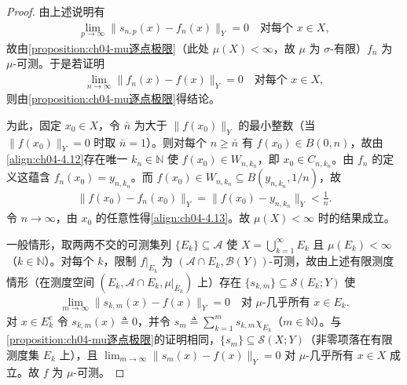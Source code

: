 \documentclass[../../main.tex]{subfiles}%
\begin{document}
\begin{proof}
由上述说明有
\begin{align*}
\lim_{p\to\infty}\|s_{n,p}(x)-f_n(x)\|_Y=0\quad\text{对每个 }x\in X,
\end{align*}
故由\cref{proposition:ch04-mu逐点极限}（此处 $\mu(X)<\infty$，故 $\mu$ 为 $\sigma$-有限）$f_n$ 为 $\mu$-可测。于是若证明
\begin{align}
\lim_{n\to\infty}\|f_n(x)-f(x)\|_Y=0\quad\text{对每个 }x\in X, \label{align:ch04-4.13}
\end{align}
则由\cref{proposition:ch04-mu逐点极限}得结论。

为此，固定 $x_0\in X$，令 $\bar n$ 为大于 $\|f(x_0)\|_Y$ 的最小整数（当 $\|f(x_0)\|_Y=0$ 时取 $\bar n=1$）。则对每个 $n\geqslant\bar n$ 有 $f(x_0)\in B(0,n)$，故由\eqref{align:ch04-4.12}存在唯一 $k_n\in\mathbb{N}$ 使 $f(x_0)\in W_{n,k_n}$，即 $x_0\in C_{n,k_n}$。由 $f_n$ 的定义这蕴含 $f_n(x_0)=y_{n,k_n}$。而 $f(x_0)\in W_{n,k_n}\subseteq B(y_{n,k_n},1/n)$，故
\begin{align*}
\|f(x_0)-f_n(x_0)\|_Y=\|f(x_0)-y_{n,k_n}\|_Y<\frac1n.
\end{align*}
令 $n\to\infty$，由 $x_0$ 的任意性得\eqref{align:ch04-4.13}。故 $\mu(X)<\infty$ 时的结果成立。

一般情形，取两两不交的可测集列 $\{E_k\}\subseteq\mathcal{A}$ 使 $X=\bigcup_{k=1}^\infty E_k$ 且 $\mu(E_k)<\infty$（$k\in\mathbb{N}$）。对每个 $k$，限制 $f|_{E_k}$ 为 $(\mathcal{A}\cap E_k,\mathcal{B}(Y))$-可测，故由上述有限测度情形（在测度空间 $(E_k,\mathcal{A}\cap E_k,\mu|_{E_k})$ 上）存在 $\{s_{k,m}\}\subseteq\mathcal{S}(E_k;Y)$ 使
\begin{align*}
\lim_{m\to\infty}\|s_{k,m}(x)-f(x)\|_Y=0\quad\text{对 }\mu\text{-几乎所有 }x\in E_k.
\end{align*}
对 $x\in E_k^c$ 令 $s_{k,m}(x)\triangleq0$，并令 $s_m\triangleq\sum_{k=1}^m s_{k,m}\chi_{E_k}$（$m\in\mathbb{N}$）。与\cref{proposition:ch04-mu逐点极限}的证明相同，$\{s_m\}\subseteq\mathcal{S}(X;Y)$（非零项落在有限测度集 $E_k$ 上），且 $\lim_{m\to\infty}\|s_m(x)-f(x)\|_Y=0$ 对 $\mu$-几乎所有 $x\in X$ 成立。故 $f$ 为 $\mu$-可测。
\end{proof}
\end{document}
